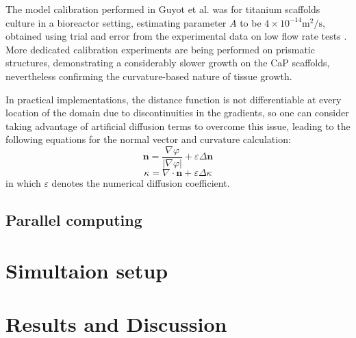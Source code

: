 The model calibration performed in Guyot et al. \cite{Guyot2014} was for titanium scaffolds culture in a bioreactor setting, estimating parameter $A$ to be $4\times10^{-14} \text{m}^2/\text{s}$, obtained using trial and error from the experimental data on low flow rate tests \cite{Papantoniou2014}.
More dedicated calibration experiments are being performed on prismatic structures, demonstrating a considerably slower growth on the CaP scaffolds, nevertheless confirming the curvature-based nature of tissue growth.

In practical implementations, the distance function is not differentiable at every location of the domain due to discontinuities in the gradients, so one can consider taking advantage of artificial diffusion terms to overcome this issue, leading to the following equations for the normal vector and curvature calculation:
\begin{equation}
\boldsymbol{n}=\frac{\nabla \varphi}{|\nabla \varphi|}+\varepsilon \Delta \boldsymbol{n}
\end{equation}
\begin{equation}
\kappa=\nabla \cdot \boldsymbol{n}+\varepsilon \Delta \kappa
\end{equation}
in which $\varepsilon$ denotes the numerical diffusion coefficient.


\subsection{Parallel computing}


\section{Simultaion setup}




\section{Results and Discussion}


